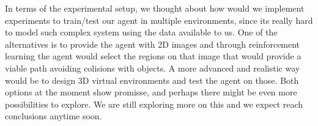 \documentclass[letterpaper,10pt]{article}
\begin{document}
In terms of the experimental setup, we thought about how would we implement
experiments to train/test our agent in multiple environments, since its 
really hard to model such complex system using the data available to us. 
One of the alternatives is to provide the agent with 2D images and through 
reinforcement learning the agent would select the regions on that image that 
would provide a viable path avoiding colisions with objects. A more advanced 
and realistic way would be to design 3D virtual environments and test the 
agent on those. Both options at the moment show promisse, and perhaps 
there might be even more possibilities to explore.
We are still exploring more on this and we expect reach 
conclusions anytime soon.

\printbibliography
\end{document}
